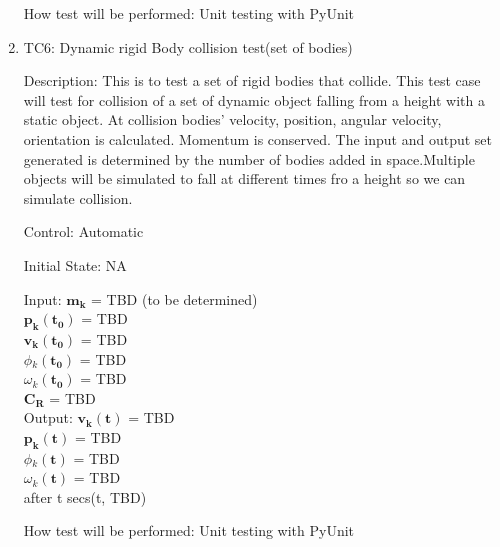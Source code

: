 \documentclass[12pt, titlepage]{article}
\begin{document}
\begin{enumerate}
	
	How test will be performed: Unit testing with PyUnit
	
	\item{TC6: Dynamic rigid Body collision test(set of bodies)\\}

Description: This is to test a set of rigid bodies that collide. This test case will test for collision of a set of dynamic object falling from a height with a static object. At collision bodies' velocity, position, angular velocity, orientation is calculated. Momentum is conserved. The input and output set generated is determined by the number of bodies added in space.Multiple objects will be simulated to fall at different times fro a height so we can simulate collision.

Control: Automatic

Initial State: NA

Input: $\mathbf{m_k}$$\mathbf{}$ = TBD (to be determined)\\
\hspace*{1.3cm}$\mathbf{p_k}$$\mathbf{(t_0)}$ = TBD\\
\hspace*{1.3cm}$\mathbf{v_k}$$\mathbf{(t_0)}$ = TBD\\
\hspace*{1.3cm}$\phi$$_k\mathbf{(t_0)}$ = TBD\\
\hspace*{1.3cm}$\omega$$_k\mathbf{(t_0)}$$ \mathbf{}$ = TBD\\
\hspace*{1.3cm}$\mathbf{C_R}$$\mathbf{}$ = TBD \\


Output:  $\mathbf{v_k}$$\mathbf{(t)}$ = TBD \\
\hspace*{1.3cm}$\mathbf{p_k}$$\mathbf{(t)}$ = TBD\\
\hspace*{1.3cm}$\phi$$_k\mathbf{(t)}$ = TBD\\
\hspace*{1.3cm}$\omega$$_k\mathbf{(t)}$$ \mathbf{}$ = TBD\\
after t secs(t, TBD) 

How test will be performed: Unit testing with PyUnit

\end{enumerate}	
	
\end{document}
